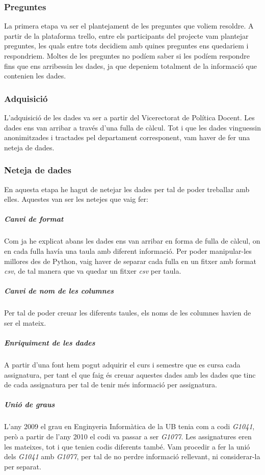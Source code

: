 \documentclass[12pt,a4paper,catalan]{article}
\begin{document}
\subsubsection{Preguntes}
La primera etapa va ser el plantejament de les preguntes que voliem resoldre. A partir de la plataforma trello, entre els participants del projecte vam plantejar preguntes, les quals entre tots decidiem amb quines preguntes ens quedariem i respondriem. Moltes de les preguntes no podíem saber si les podíem respondre fins que ens arribessin les dades, ja que depeniem totalment de la informació que contenien les dades.

\subsubsection{Adquisició}
L'adquisició de les dades va ser a partir del Vicerectorat de Política Docent. Les dades ens van arribar a través d'una fulla de càlcul. Tot i que les dades vinguessin anonimitzades i tractades pel departament corresponent, vam haver de fer una neteja de dades.

\subsubsection{Neteja de dades}
En aquesta etapa he hagut de netejar les dades per tal de poder treballar amb elles. Aquestes van ser les netejes que vaig fer:

\subparagraph{Canvi de format}
Com ja he explicat abans les dades ens van arribar en forma de fulla de càlcul, on en cada fulla havía una taula amb diferent informació. Per poder manipular-les millores des de Python, vaig haver de separar cada fulla en un fitxer amb format \textit{csv}, de tal manera que va quedar un fitxer \textit{csv} per taula.

\subparagraph{Canvi de nom de les columnes}
Per tal de poder creuar les diferents taules, els noms de les columnes havien de ser el mateix.

\subparagraph{Enriquiment de les dades}
A partir d'una font hem pogut adquirir el curs i semestre que es cursa cada assignatura, per tant el que faig és creuar aquestes dades amb les dades que tinc de cada assignatura per tal de tenir més informació per assignatura.

\subparagraph{Unió de graus}
L'any 2009 el grau en Enginyeria Informàtica de la UB tenia com a codi \textit{G1041}, però a partir de l'any 2010 el codi va passar a ser \textit{G1077}. Les assignatures eren les mateixes, tot i que tenien codis diferents també. Vam procedir a fer la unió dels \textit{G1041} amb \textit{G1077}, per tal de no perdre informació rellevant, ni considerar-la per separat.
\end{document}
